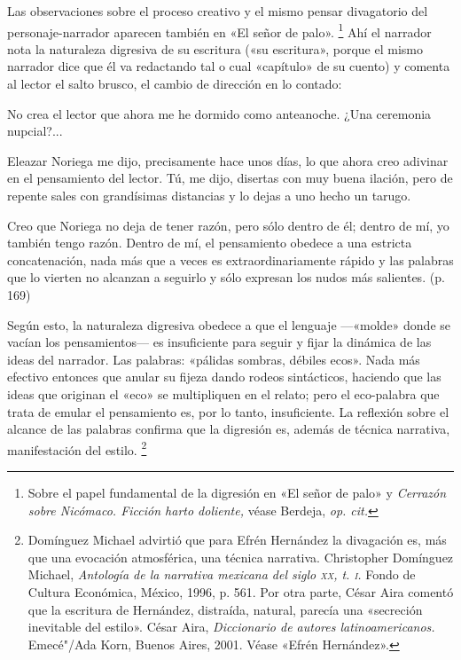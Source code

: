 \documentclass[14pt,twoside,final]{extbook} %
\let\oldfootnote\footnote
\renewcommand\footnote[1]{%
\oldfootnote{\hspace{1mm}#1}}
\begin{document}
Las observaciones sobre el proceso creativo y el mismo pensar divagatorio del personaje-narrador aparecen también en «El señor de palo».\footnote{Sobre el papel fundamental de la digresión en «El señor de palo» y \emph{Cerrazón sobre Nicómaco. Ficción harto doliente,} véase Berdeja, \emph{op. cit.}} Ahí el narrador nota la naturaleza digresiva de su escritura («su escritura», porque el mismo narrador dice que él va redactando tal o cual «capítulo» de su cuento) y comenta al lector el salto brusco, el cambio de dirección en lo contado:
\begin{quoting}
No crea el lector que ahora me he dormido como anteanoche. ¿Una ceremonia nupcial?...

Eleazar Noriega me dijo, precisamente hace unos días, lo que ahora creo adivinar en el pensamiento del lector. Tú, me dijo, disertas con muy buena ilación, pero de repente sales con grandísimas distancias y lo dejas a uno hecho un tarugo.

Creo que Noriega no deja de tener razón, pero sólo dentro de él; dentro de mí, yo también tengo razón. Dentro de mí, el pensamiento obedece a una estricta concatenación, nada más que a veces es extraordinariamente rápido y las palabras que lo vierten no alcanzan a seguirlo y sólo expresan los nudos más salientes. (p. 169)
\end{quoting}
Según esto, la naturaleza digresiva obedece a que el lenguaje ---«molde» donde se vacían los pensamientos--- es insuficiente para seguir y fijar la dinámica de las ideas del narrador. Las palabras: «pálidas sombras, débiles ecos». Nada más efectivo entonces que anular su fijeza dando
rodeos sintácticos, haciendo que las ideas que originan el «eco» se multipliquen en el relato; pero el eco-palabra que trata de emular el pensamiento es, por lo tanto, insuficiente. La reflexión sobre el alcance de las palabras confirma que la digresión es, además de técnica narrativa, manifestación del estilo.\footnote{Domínguez Michael advirtió que para Efrén Hernández la divagación es, más que una evocación atmosférica, una técnica narrativa. Christopher Domínguez Michael, \emph{Antología de la narrativa mexicana del siglo \textsc{xx}, t. \textsc{i}.} Fondo de Cultura Económica, México, 1996, p. 561. Por otra parte, César Aira comentó que la escritura de Hernández, distraída, natural, parecía una «secreción inevitable del estilo». César Aira, \emph{Diccionario de autores latinoamericanos.} Emecé"/Ada Korn, Buenos Aires, 2001. Véase «Efrén Hernández».}
\end{document}
